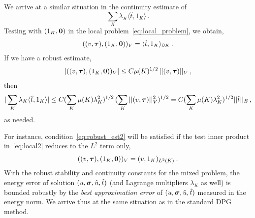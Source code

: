 \documentclass[Proposal.tex]{subfiles}
\begin{document}
We arrive at a similar situation in the continuity estimate of
$$
\sum_K \lambda_K \langle \hat{t}, 1_K \rangle\,.
$$
Testing with $(1_K,{\bf 0})$ in the local problem~\eqref{eq:local_problem}, we obtain,
\begin{equation}
((v,\boldsymbol\tau),(1_K,{\bf 0}))_V = \langle \hat{t}, 1_K \rangle_{\partial K}\,.
\label{eq:local2}
\end{equation}
If we have a robust estimate,
\begin{equation}
| ((v,\boldsymbol\tau),(1_K,{\bf 0}))_V | \leq C \mu(K)^{1/2} \, || (v,\boldsymbol\tau) ||_V\,,
\label{eq:robust_est2}
\end{equation}
then
\begin{equation}
| \sum_K \lambda_K \langle \hat{t}, 1_K \rangle | \leq C (\sum_K \mu(K) \lambda_K^2)^{1/2}
\, (\sum_K || (v,\boldsymbol\tau) ||_V^2)^{1/2}
= C (\sum_K \mu(K) \lambda_K^2)^{1/2}  || \hat{t} ||_E\,,
\end{equation}
as needed.

For instance, condition~\eqref{eq:robust_est2} will be satisfied if the test inner product
in~\eqref{eq:local2} reduces to the $L^2$ term only,
\begin{equation}
((v,\boldsymbol\tau),(1_K,{\bf 0}))_V = (v,1_K)_{L^2(K)} \: .
\end{equation}
With the robust stability and continuity constants for the mixed problem, the energy error
of solution $(u,\boldsymbol\sigma,\hat{u},\hat{t})$ (and Lagrange multipliers $\lambda_K$ as well)
is bounded robustly by the {\em best approximation error} of  $(u,\boldsymbol\sigma,\hat{u},\hat{t})$
measured in the energy norm. We arrive thus at the same situation as in the standard
DPG method.

%                                                                                                      
%                                                                                                      
% 
\end{document}
